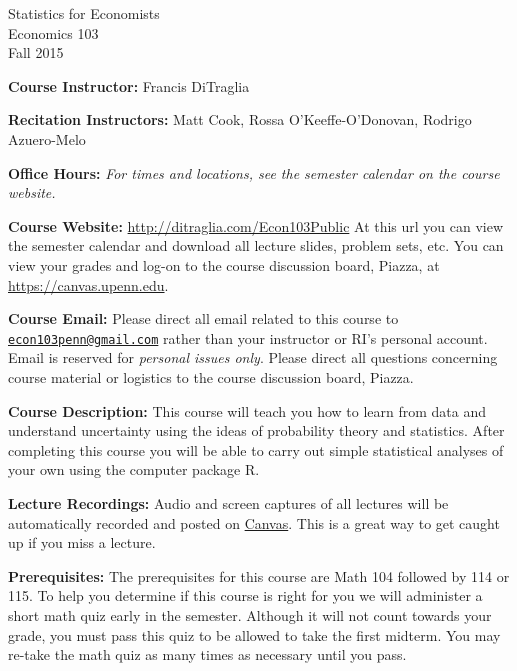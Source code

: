 \documentclass[11pt, letterpaper]{article}
\begin{document}
\thispagestyle{plain}

\begin{center}
\Large
\sc
Statistics for Economists\\
\large
Economics 103\\
\large
Fall 2015
\end{center}


\normalsize
\bigskip
\noindent \textbf{Course Instructor:} Francis DiTraglia 

\medskip


\noindent \textbf{Recitation Instructors:}
  Matt Cook,  
  Rossa O'Keeffe-O'Donovan,
  Rodrigo Azuero-Melo
\medskip


\noindent \textbf{Office Hours:} \emph{For times and locations, see the semester calendar on the course website.}


\medskip
 
\noindent \textbf{Course Website:} \url{http://ditraglia.com/Econ103Public} At this url you can view the semester calendar and download all lecture slides, problem sets, etc.
You can view your grades and log-on to the course discussion board, Piazza, at \url{https://canvas.upenn.edu}.

\medskip

\noindent \textbf{Course Email:} Please direct all email related to this course to \href{mailto:econ103penn@gmail.com}{\texttt{econ103penn@gmail.com}} rather than your instructor or RI's personal account.
Email is reserved for \emph{personal issues only}. 
Please direct all questions concerning course material or logistics to the course discussion board, Piazza.

\medskip



\noindent \textbf{Course Description:} 
This course will teach you how to learn from data and understand uncertainty using the ideas of probability theory and statistics. 
After completing this course you will be able to carry out simple statistical analyses of your own using the computer package R.


\medskip

\noindent \textbf{Lecture Recordings: } 
Audio and screen captures of all lectures will be automatically recorded and posted on \href{http://upenn.instructure.com}{Canvas}. 
This is a great way to get caught up if you miss a lecture.
\medskip

\noindent \textbf{Prerequisites:} 
The prerequisites for this course are Math 104 followed by 114 or 115. 
To help you determine if this course is right for you we will administer a short math quiz early in the semester.
Although it will not count towards your grade, you must pass this quiz to be allowed to take the first midterm.
You may re-take the math quiz as many times as necessary until you pass.
\end{document}
